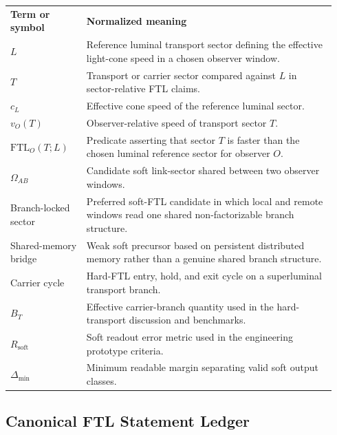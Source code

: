 \begin{tabular}{L{0.22\linewidth}L{0.72\linewidth}}
\textbf{Term or symbol} & \textbf{Normalized meaning} \\
$L$ & Reference luminal transport sector defining the effective light-cone speed in a chosen observer window. \\
$T$ & Transport or carrier sector compared against $L$ in sector-relative FTL claims. \\
$c_L$ & Effective cone speed of the reference luminal sector. \\
$v_O(T)$ & Observer-relative speed of transport sector $T$. \\
$\mathrm{FTL}_O(T;L)$ & Predicate asserting that sector $T$ is faster than the chosen luminal reference sector for observer $O$. \\
$\Omega_{AB}$ & Candidate soft link-sector shared between two observer windows. \\
Branch-locked sector & Preferred soft-FTL candidate in which local and remote windows read one shared non-factorizable branch structure. \\
Shared-memory bridge & Weak soft precursor based on persistent distributed memory rather than a genuine shared branch structure. \\
Carrier cycle & Hard-FTL entry, hold, and exit cycle on a superluminal transport branch. \\
$B_T$ & Effective carrier-branch quantity used in the hard-transport discussion and benchmarks. \\
$R_{\mathrm{soft}}$ & Soft readout error metric used in the engineering prototype criteria. \\
$\Delta_{\min}$ & Minimum readable margin separating valid soft output classes. \\
\end{tabular}

\subsection*{Canonical FTL Statement Ledger}

